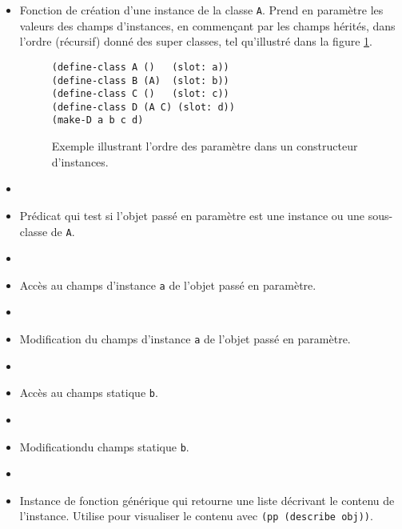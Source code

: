 \documentclass[letterpaper,12pt]{book}
\begin{document}
      \begin{itemize}
      \item[\texttt{(make-A a)}:] Fonction de création d'une instance
        de la classe \texttt{A}. Prend en paramètre les valeurs des
        champs d'instances, en commençant par les champs hérités, dans
        l'ordre (récursif) donné des super classes, tel qu'illustré
        dans la figure \ref{ex-make-instance}.
        \begin{figure}[h!]
          \begin{lstlisting}
(define-class A ()   (slot: a))
(define-class B (A)  (slot: b))
(define-class C ()   (slot: c))
(define-class D (A C) (slot: d))
(make-D a b c d)
          \end{lstlisting}
          \caption{Exemple illustrant l'ordre des paramètre dans un
            constructeur d'instances.}
          \label{ex-make-instance}
        \end{figure}
      \item[]

      \item[\texttt{(A? obj)}:] Prédicat qui test si l'objet passé en
        paramètre est une instance ou une sous-classe de \texttt{A}.
      \item[]

      \item[\texttt{(A-a obj)}:] Accès au champs d'instance \texttt{a}
        de l'objet passé en paramètre.
      \item[]

      \item[\texttt{(A-a-set! obj new-a)}:] Modification du champs
        d'instance \texttt{a} de l'objet passé en paramètre.
      \item[]

      \item[\texttt{(A-b)}:] Accès au champs statique \texttt{b}.
      \item[]

      \item[\texttt{(A-b-set! new-b)}:] Modificationdu champs
        statique \texttt{b}.
      \item[]

      \item[\texttt{(describe obj)}:] Instance de fonction générique
        qui retourne une liste décrivant le contenu de
        l'instance. Utilise pour visualiser le contenu avec
        \texttt{(pp (describe obj))}.
      \end{itemize}
\end{document}
